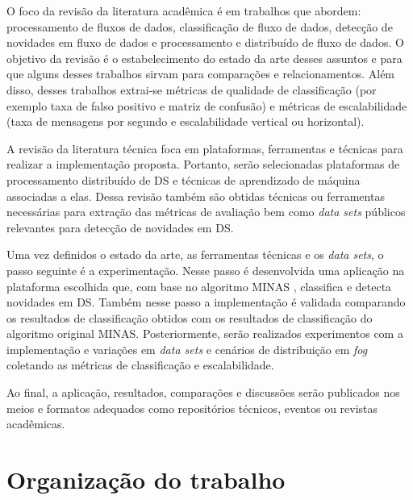 O foco da revisão da literatura acadêmica é em trabalhos que abordem:
processamento de fluxos de dados, classificação de fluxo de dados, detecção de
novidades em fluxo de dados e processamento e distribuído de fluxo de dados.
O objetivo da revisão é o estabelecimento do estado da arte desses assuntos
e para que alguns desses trabalhos sirvam para comparações e relacionamentos.
Além disso, desses trabalhos extrai-se métricas de qualidade de classificação
(por exemplo taxa de falso positivo e matriz de confusão) e métricas de
escalabilidade (taxa de mensagens por segundo e escalabilidade vertical ou
horizontal).

A revisão da literatura técnica foca em plataformas, ferramentas e técnicas
para realizar a implementação proposta.
Portanto, serão selecionadas plataformas de processamento distribuído de DS
e técnicas de aprendizado de máquina associadas a elas.
Dessa revisão também são obtidas técnicas ou ferramentas necessárias
para extração das métricas de avaliação bem como \emph{data sets}
públicos relevantes para detecção de novidades em DS.

Uma vez definidos o estado da arte, as ferramentas técnicas e os
\emph{data sets}, o passo seguinte é a experimentação.
Nesse passo é desenvolvida uma aplicação na plataforma escolhida que, com base no
algoritmo MINAS \cite{Faria2016minas}, classifica e detecta novidades em DS.
Também nesse passo a implementação é validada comparando os resultados de
classificação obtidos com os resultados de classificação do algoritmo original
MINAS.
Posteriormente, serão realizados experimentos com a implementação e variações em \emph{data sets} e
cenários de distribuição em \emph{fog} coletando as métricas de classificação e escalabilidade.

Ao final, a aplicação, resultados, comparações e discussões serão publicados
nos meios e formatos adequados como repositórios técnicos, eventos ou revistas
acadêmicas.

\section{Organização do trabalho}






